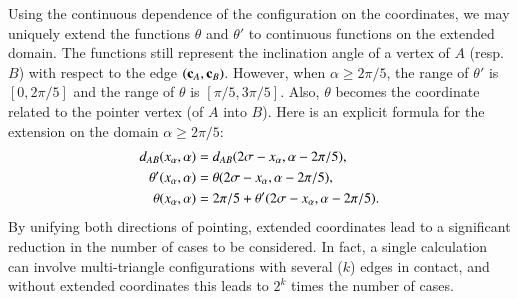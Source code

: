 Using the continuous dependence of the configuration on the
coordinates, we may uniquely extend the functions $\theta$ and
$\theta'$ to continuous functions on the extended domain.  The
functions still represent the inclination angle of a vertex of $A$
(resp. $B$) with respect to the edge $({\mathbf c}_A,{\mathbf c}_B)$.  However, when
$\alpha\ge 2\pi/5$, the range of $\theta'$ is $[0,2\pi/5]$ and the
range of $\theta$ is $[\pi/5,3\pi/5]$.  Also, $\theta$ becomes
the coordinate related to the pointer vertex (of $A$ into $B$).
Here is an explicit formula
for the extension on the domain $\alpha\ge 2\pi/5$:
\begin{align*}
d_{AB}(x_\alpha,\alpha) &=d_{AB}(2\sigma-x_\alpha,\alpha-2\pi/5),\\
\theta'(x_\alpha,\alpha) 
&= \theta(2\sigma-x_\alpha,\alpha-2\pi/5),\\
\theta(x_\alpha,\alpha) 
&= 2\pi/5+ \theta'(2\sigma-x_\alpha,\alpha-2\pi/5).
\end{align*}
By unifying both directions of pointing, extended coordinates lead to
a significant reduction in the number of cases to be considered.  In
fact, a single calculation can involve multi-triangle configurations
with several ($k$) edges in contact, and without extended coordinates
this leads to $2^k$ times the number of cases.


